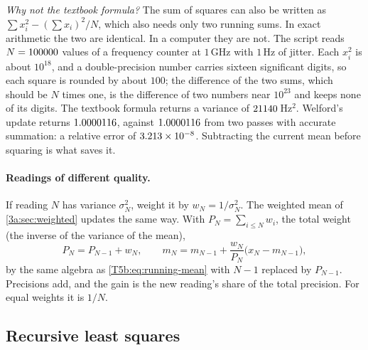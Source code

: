 \emph{Why not the textbook formula?} The sum of squares can also be written as
$\sum x_i^2-(\sum x_i)^2/N$, which also needs only two running sums. In exact
arithmetic the two are identical. In a computer they are not. The script
 reads $N=100000$ values of a frequency counter at
$1$\,GHz with $1$\,Hz of jitter. Each $x_i^2$ is about $10^{18}$, and a double-precision
number carries sixteen significant digits, so each square is rounded by
about $100$; the difference of the two sums, which should be $N$ times one, is
the difference of two numbers near $10^{23}$ and keeps none of its digits.
The textbook formula returns a variance of $21140$\,Hz$^2$. Welford's update
returns $1.0000116$, against $1.0000116$ from two passes with accurate
summation: a relative error of $3.213\times10^{-8}$. Subtracting the current mean
before squaring is what saves it.


\paragraph{Readings of different quality.}
If reading $N$ has variance $\sigma_N^2$, weight it by $w_N=1/\sigma_N^2$. The weighted
mean of \cref{3a:sec:weighted} updates the same way. With $P_N=\sum_{i\le N}w_i$, the
total weight (the inverse of the variance of the mean),
\begin{equation}
  P_N=P_{N-1}+w_N,\qquad
  m_N=m_{N-1}+\frac{w_N}{P_N}\bigl(x_N-m_{N-1}\bigr),
  \label{T5b:eq:running-wmean}
\end{equation}
by the same algebra as \eqref{T5b:eq:running-mean} with $N-1$ replaced by $P_{N-1}$.
Precisions add, and the gain is the new reading's share of the total
precision. For equal weights it is $1/N$.

\subsection{Recursive least squares}
\label{T5b:sec:rls}


